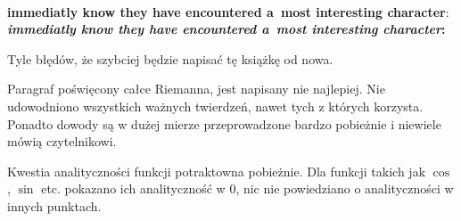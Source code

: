 \documentclass[a4paper,11pt]{article}
\begin{document}
\vspace{\spaceTwo}







\noi
{} \\
\Jest \textbf{immediatly know they have encountered a~most interesting
  character}: \\
\Pow \textbf{\emph{immediatly know they have encountered a~most
    interesting
    character}:} \\

\vspace{\spaceTwo}






 \start Tyle błędów, że szybciej będzie napisać tę
książkę od nowa.
  
\vspace{\spaceFour}


\start Paragraf poświęcony całce Riemanna, jest napisany nie
najlepiej. Nie udowodniono wszystkich ważnych twierdzeń, nawet tych z
których korzysta. Ponadto dowody są w dużej mierze przeprowadzone
bardzo pobieżnie i niewiele mówią czytelnikowi.


\start Kwestia analityczności funkcji potraktowna pobieżnie. Dla
funkcji takich jak $\cos$, $\sin$ etc. pokazano ich analityczność w 0,
nic nie powiedziano o analityczności w innych punktach.
\end{document}

